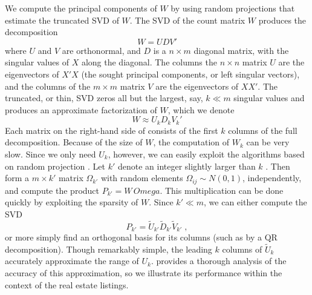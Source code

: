\documentclass[10pt]{article}
\begin{document}
 
 We compute the principal components of $W$ by using random projections that
 estimate the truncated SVD of $W$.  The SVD of the count matrix $W$ produces
 the decomposition
 \begin{equation}
       W = U D V'
 \end{equation}
 where $U$ and $V$ are orthonormal, and $D$ is a $n \times m$ diagonal matrix,
 with the singular values of $X$ along the diagonal.  The columns the $n \times
 n$ matrix $U$ are the eigenvectors of $X'X$ (the sought principal components,
 or left singular vectors), and the columns of the $m \times m$ matrix $V$ are
 the eigenvectors of $XX'$.  The truncated, or thin, SVD zeros all but the
 largest, say, $k \ll m$ singular values and produces an approximate
 factorization of $W$, which we denote
 \begin{equation}
       W \approx U_k D_k V_k'
 \label{eq:Wk}
 \end{equation}
 Each matrix on the right-hand side of  consists of the first $k$
 columns of the full decomposition.  Because of the size of $W$, the computation
 of $W_k$ can be very slow.  Since we only need $U_k$, however, we can easily
 exploit the algorithms based on random projection \citep{tropp10}. Let $k'$
 denote an integer slightly larger than $k$ \citep[see][for the
 details]{tropp10}.  Then form a $m \times k'$ matrix $\Omega_{k'}$ with random
 elements $\Omega_{ij} \sim N(0,1)$, independently, and compute the product
 $P_{k'} = W \,Omega$.  This multiplication can be done quickly by exploiting
 the sparsity of $W$.  Since $k' \ll m$, we can either compute the SVD
 \begin{equation}
   P_{k'} = \tilde{U}_{k'} \tilde{D}_{k'} \tilde{V}_{k'}  \;,
 \end{equation}
 or more simply find an orthogonal basis for its columns (such as by a QR
 decomposition).  Though remarkably simple, the leading $k$ columns of
 $\tilde{U}_k$ accurately approximate the range of $U_k$.  \citet{tropp10}
 provides a thorough analysis of the accuracy of this approximation, so we
 illustrate its performance within the context of the real estate listings.
\end{document}
